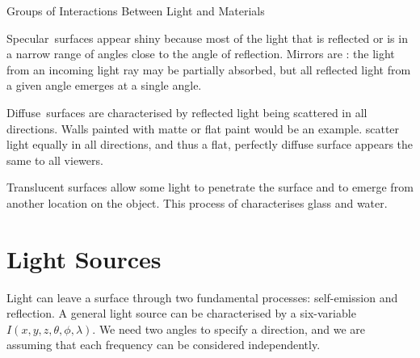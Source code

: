 \documentclass[../COS3712_Notes.tex]{subfiles}
\begin{document}
      \begin{sidenote}{Groups of Interactions Between Light and Materials}
        $ $\vspace{-1em}
        \begin{descriptimize}[nosep]
          \item[Specular~surfaces] appear shiny because most of the light
            that is reflected or  is in a narrow range of angles
            close to the angle of reflection.
            Mirrors are : the light from an incoming
            light ray may be partially absorbed, but all reflected light from a given angle
            emerges at a single angle.
          \item[Diffuse~surfaces] are characterised by reflected light being scattered
            in all directions.
            Walls painted with matte or flat paint would be an example.
             scatter light equally in all directions,
            and thus a flat, perfectly diffuse surface appears the same to all viewers.
          \item[Translucent surfaces] allow some light to penetrate the surface
            and to emerge from another location on the object.
            This process of  characterises glass and water.
        \end{descriptimize}
      \end{sidenote}

    \section{Light Sources}
      Light can leave a surface through two fundamental processes: self-emission and reflection.
      A general light source can be characterised by a six-variable 
      $I(x, y, z, \theta, \phi, \lambda)$.
      We need two angles to specify a direction, and we are assuming that each frequency
      can be considered independently.
\end{document}
